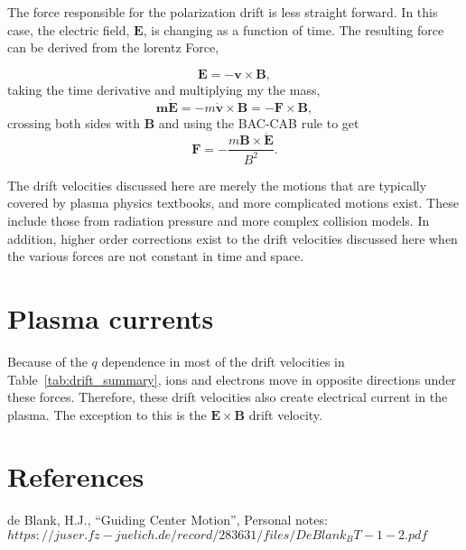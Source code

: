 \documentclass[12pt]{iopart}
\begin{document}
The force responsible for the polarization drift is less straight forward.  In this case, the electric field, $\mathbf{E}$, is changing as a function of time.  The resulting force can be derived from the lorentz Force,

\begin{equation*}
\mathbf{E} = - \mathbf{v} \times \mathbf{B},
\end{equation*}
taking the time derivative and multiplying my the mass,
\begin{equation*}
\mathbf{m\mathbf{\dot{E}}} = - m\mathbf{\dot{v}} \times \mathbf{B} = - \mathbf{F} \times \mathbf{B},
\end{equation*}
crossing both sides with $\mathbf{B}$ and using the BAC-CAB rule to get 
\begin{equation}
\mathbf{F} = - \frac{m \mathbf{B} \times \mathbf{\dot{E}}}{B^2}.
\end{equation}

The drift velocities discussed here are merely the motions that are typically covered by plasma physics textbooks, and more complicated motions exist.  These include those from radiation pressure and more complex collision models.  In addition, higher order corrections exist to the drift velocities discussed here when the various forces are not constant in time and space.  

\section{Plasma currents}

Because of the $q$ dependence in most of the drift velocities in Table~\ref{tab:drift_summary}, ions and electrons move in opposite directions under these forces.  Therefore, these drift velocities also create electrical current in the plasma.  The exception to this is the $\mathbf{E} \times \mathbf{B}$ drift velocity. 

\section*{References}
\begin{thebibliography}{widest entry}
 de Blank, H.J., ``Guiding Center Motion'', Personal notes: $https://juser.fz-juelich.de/record/283631/files/DeBlank_BT-1-2.pdf$
\end{thebibliography}
\end{document}
